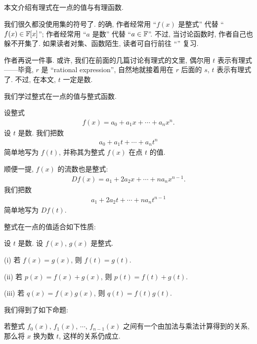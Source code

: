 \subsection*{\ValueOfARationalExpressionAtAPoint}
\markright{\ValueOfARationalExpressionAtAPoint}

本文介绍有理式在一点的值与有理函数.

我们很久都没使用集的符号了. 的确, 作者经常用 ``$f(x)$ 是整式'' 代替 ``$f(x) \in \mathbb{F}[x]$''; 作者经常用 ``$a$ 是数'' 代替 ``$a \in \mathbb{F}$''. 不过, 当讨论函数时, 作者自己也躲不开集了. 如果读者对集、函数陌生, 读者可自行前往 ``\Prerequisites'' 复习.

作者再说一件事. 或许, 我们在前面的几篇讨论有理式的文里, 偶尔用 $t$ 表示有理式——毕竟, $r$ 是 ``rational expression'', 自然地就接着用在 $r$ 后面的 $s$, $t$ 表示有理式了. 不过, 在本文, $t$ 一定是数.

我们学过整式在一点的值与整式函数.

\begin{definition}
    设整式
    \begin{align*}
        f(x) = a_0 + a_1 x + \cdots + a_n x^n.
    \end{align*}
    设 $t$ 是数. 我们把数
    \begin{align*}
        a_0 + a_1 t + \cdots + a_n t^n
    \end{align*}
    简单地写为 $f(t)$, 并称其为整式 $f(x)$ 在点 $t$ 的值.

    顺便一提, $f(x)$ 的流数也是整式:
    \begin{align*}
        Df (x) = a_1 + 2a_2 x + \cdots + na_n x^{n-1}.
    \end{align*}
    我们把数
    \begin{align*}
        a_1 + 2a_2 t + \cdots + na_n t^{n-1}
    \end{align*}
    简单地写为 $Df (t)$.
\end{definition}

整式在一点的值适合如下性质:
\begin{proposition}
    设 $t$ 是数. 设 $f(x)$, $g(x)$ 是整式.

    (i) 若 $f(x) = g(x)$, 则 $f(t) = g(t)$.

    (ii) 若 $p(x) = f(x) + g(x)$, 则 $p(t) = f(t) + g(t)$.

    (iii) 若 $q(x) = f(x) g(x)$, 则 $q(t) = f(t) g(t)$.
\end{proposition}

我们得到了如下命题:
\begin{proposition}
    若整式 $f_0 (x)$, $f_1 (x)$, $\cdots$, $f_{n-1} (x)$ 之间有一个由加法与乘法计算得到的关系, 那么将 $x$ 换为数 $t$, 这样的关系仍成立.
\end{proposition}

